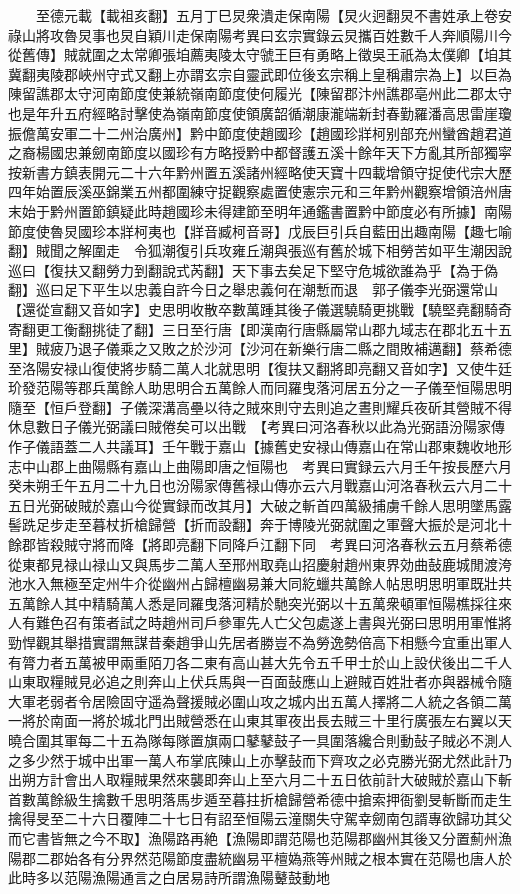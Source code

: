 　　至德元載【載祖亥翻】五月丁巳炅衆潰走保南陽【炅火迥翻炅不書姓承上卷安祿山將攻魯炅事也炅自穎川走保南陽考異曰玄宗實錄云炅攜百姓數千人奔順陽川今從舊傳】賊就圍之太常卿張垍薦夷陵太守虢王巨有勇略上徵吳王祇為太僕卿【垍其冀翻夷陵郡峽州守式又翻上亦謂玄宗自靈武即位後玄宗稱上皇稱肅宗為上】以巨為陳留譙郡太守河南節度使兼統嶺南節度使何履光【陳留郡汴州譙郡亳州此二郡太守也是年升五府經略討擊使為嶺南節度使領廣韶循潮康瀧端新封春勤羅潘高思雷崖瓊振儋萬安軍二十二州治廣州】黔中節度使趙國珍【趙國珍牂柯别部充州蠻酋趙君道之裔楊國忠兼劒南節度以國珍有方略授黔中都督護五溪十餘年天下方亂其所部獨寜按新書方鎮表開元二十六年黔州置五溪諸州經略使天寶十四載增領守捉使代宗大歷四年始置辰溪巫錦業五州都圍練守捉觀察處置使憲宗元和三年黔州觀察增領涪州唐末始于黔州置節鎮疑此時趙國珍未得建節至明年通鑑書置黔中節度必有所據】南陽節度使魯炅國珍本牂柯夷也【牂音臧柯音哥】戊辰巨引兵自藍田出趣南陽【趣七喻翻】賊聞之解圍走　令狐潮復引兵攻雍丘潮與張巡有舊於城下相勞苦如平生潮因說巡曰【復扶又翻勞力到翻說式芮翻】天下事去矣足下堅守危城欲誰為乎【為于偽翻】巡曰足下平生以忠義自許今日之舉忠義何在潮慙而退　郭子儀李光弼還常山【還從宣翻又音如字】史思明收散卒數萬踵其後子儀選驍騎更挑戰【驍堅堯翻騎奇寄翻更工衡翻挑徒了翻】三日至行唐【即漢南行唐縣屬常山郡九域志在郡北五十五里】賊疲乃退子儀乘之又敗之於沙河【沙河在新樂行唐二縣之間敗補邁翻】蔡希德至洛陽安禄山復使將步騎二萬人北就思明【復扶又翻將即亮翻又音如字】又使牛廷玠發范陽等郡兵萬餘人助思明合五萬餘人而同羅曳落河居五分之一子儀至恒陽思明隨至【恒戶登翻】子儀深溝高壘以待之賊來則守去則追之晝則耀兵夜斫其營賊不得休息數日子儀光弼議曰賊倦矣可以出戰　【考異曰河洛春秋以此為光弼語汾陽家傳作子儀語蓋二人共議耳】壬午戰于嘉山【據舊史安禄山傳嘉山在常山郡東魏收地形志中山郡上曲陽縣有嘉山上曲陽即唐之恒陽也　考異曰實録云六月壬午按長歷六月癸未朔壬午五月二十九日也汾陽家傳舊禄山傳亦云六月戰嘉山河洛春秋云六月二十五日光弼破賊於嘉山今從實録而改其月】大破之斬首四萬級捕虜千餘人思明墜馬露髻跣足步走至暮杖折槍歸營【折而設翻】奔于博陵光弼就圍之軍聲大振於是河北十餘郡皆殺賊守將而降【將即亮翻下同降戶江翻下同　考異曰河洛春秋云五月蔡希德從東都見禄山禄山又與馬步二萬人至邢州取堯山招慶射趙州東界効曲鼔鹿城閒渡洿池水入無極至定州牛介從幽州占歸檀幽易兼大同紇蠟共萬餘人帖思明思明軍既壯共五萬餘人其中精騎萬人悉是同羅曳落河精於馳突光弼以十五萬衆頓軍恒陽樵採往來人有難色召有策者試之時趙州司戶參軍先人亡父包處遂上書與光弼曰思明用軍惟將勁悍觀其舉措實謂無謀昔秦趙爭山先居者勝豈不為勞逸勢倍高下相懸今宜重出軍人有膂力者五萬被甲兩重陌刀各二東有高山甚大先令五千甲士於山上設伏後出二千人山東取糧賊見必追之則奔山上伏兵馬與一百面鼔應山上避賊百姓壯者亦與器械令隨大軍老弱者令居險固守遥為聲援賊必圍山攻之城内出五萬人擇將二人統之各領二萬一將於南面一將於城北門出賊營悉在山東其軍夜出長去賊三十里行廣張左右翼以天曉合圍其軍每二十五為隊每隊置旗兩口鼕鼕鼓子一具圍落纔合則動鼔子賊必不測人之多少然于城中出軍一萬人布掌㡳陳山上亦擊鼔而下齊攻之必克勝光弼尤然此計乃出朔方計會出人取糧賊果然來襲即奔山上至六月二十五日依前計大破賊於嘉山下斬首數萬餘級生擒數千思明落馬步遁至暮拄折槍歸營希德中搶索押衙劉旻斬斷而走生擒得旻至二十六日覆陣二十七日有詔至恒陽云潼關失守駕幸劒南包諝專欲歸功其父而它書皆無之今不取】漁陽路再絶【漁陽即謂范陽也范陽郡幽州其後又分置薊州漁陽郡二郡始各有分界然范陽節度盡統幽易平檀媯燕等州賊之根本實在范陽也唐人於此時多以范陽漁陽通言之白居易詩所謂漁陽鼙鼓動地